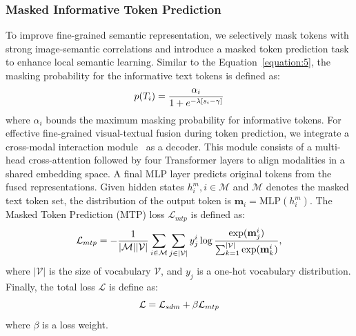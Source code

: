 \subsubsection{Masked Informative Token Prediction}
\label{section:semantic}
To improve fine-grained semantic representation, we selectively mask tokens with strong image-semantic correlations and introduce a masked token prediction task to enhance local semantic learning. Similar to the Equation~\ref{equation:5}, the masking probability for the informative text tokens is defined as:
\begin{equation}
\small
p(T_i)=\frac{\alpha_i}{1 + e^{-\lambda[s_i - \gamma ]}} 
\end{equation}
where $\alpha_i$ bounds the maximum masking probability for informative tokens. For effective fine-grained visual-textual fusion during token prediction, we integrate a cross-modal interaction module~\cite{jiang2023cross} as a decoder. This module consists of a multi-head cross-attention followed by four Transformer layers to align modalities in a shared embedding space. A final MLP layer predicts original tokens from the fused representations. Given hidden states ${h_i^m, i \in \mathcal{M}}$ and $\mathcal{M}$ denotes the masked text token set, the distribution of the output token is $\mathbf{m}_i = \text{MLP}(h^m_i)$. The Masked Token Prediction (MTP) loss $\mathcal{L}_{mtp}$ is defined as:
\begin{equation}
\small
\mathcal{L}_{mtp}=-\frac{1}{|\mathcal{M}||\mathcal{V}|}\sum_{i\in\mathcal{M}}\sum_{j\in|\mathcal{V}|}y_j^i\log\frac{\exp(\mathbf{m}_j^i)}{\sum_{k=1}^{|\mathcal{V}|}\exp(\mathbf{m}_k^i)},
\end{equation}
where $|\mathcal{V}|$ is the size of vocabulary $\mathcal{V}$, and $y_j$ is a one-hot vocabulary distribution. Finally, the total loss $\mathcal{L}$ is define as:
\begin{equation}
\small
\mathcal{L} = \mathcal{L}_{sdm} + \beta \mathcal{L}_{mtp}
\end{equation}
where $\beta$ is a loss weight.


